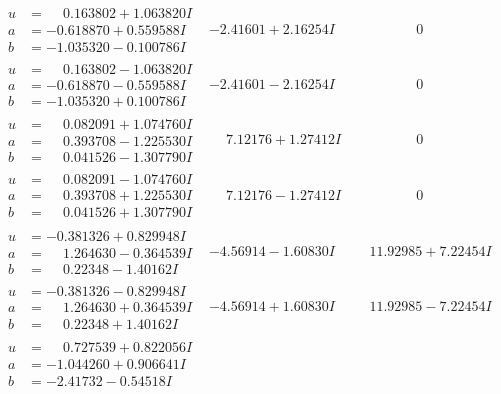 \documentclass[1p]{elsarticle_modified}
\theoremstyle{definition}
\begin{document}
$$\begin{array}{c|c|c}
\begin{aligned}
u &= \phantom{-}0.163802 + 1.063820 I \\
a &= -0.618870 + 0.559588 I \\
b &= -1.035320 - 0.100786 I\end{aligned}
 & -2.41601 + 2.16254 I & \phantom{-0.000000 } 0 \\ \hline\begin{aligned}
u &= \phantom{-}0.163802 - 1.063820 I \\
a &= -0.618870 - 0.559588 I \\
b &= -1.035320 + 0.100786 I\end{aligned}
 & -2.41601 - 2.16254 I & \phantom{-0.000000 } 0 \\ \hline\begin{aligned}
u &= \phantom{-}0.082091 + 1.074760 I \\
a &= \phantom{-}0.393708 - 1.225530 I \\
b &= \phantom{-}0.041526 - 1.307790 I\end{aligned}
 & \phantom{-}7.12176 + 1.27412 I & \phantom{-0.000000 } 0 \\ \hline\begin{aligned}
u &= \phantom{-}0.082091 - 1.074760 I \\
a &= \phantom{-}0.393708 + 1.225530 I \\
b &= \phantom{-}0.041526 + 1.307790 I\end{aligned}
 & \phantom{-}7.12176 - 1.27412 I & \phantom{-0.000000 } 0 \\ \hline\begin{aligned}
u &= -0.381326 + 0.829948 I \\
a &= \phantom{-}1.264630 - 0.364539 I \\
b &= \phantom{-}0.22348 - 1.40162 I\end{aligned}
 & -4.56914 - 1.60830 I & \phantom{-}11.92985 + 7.22454 I \\ \hline\begin{aligned}
u &= -0.381326 - 0.829948 I \\
a &= \phantom{-}1.264630 + 0.364539 I \\
b &= \phantom{-}0.22348 + 1.40162 I\end{aligned}
 & -4.56914 + 1.60830 I & \phantom{-}11.92985 - 7.22454 I \\ \hline\begin{aligned}
u &= \phantom{-}0.727539 + 0.822056 I \\
a &= -1.044260 + 0.906641 I \\
b &= -2.41732 - 0.54518 I\end{aligned}

\end{array}$$
\end{document}
